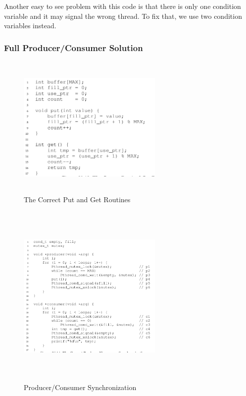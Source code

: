 Another easy to see problem with this code is that there is only one condition
variable and it may signal the wrong thread. To fix that, we use two condition
variables instead.

\subsubsection{Full Producer/Consumer Solution}

\begin{figure}[h!]
    \begin{center}
        \includegraphics[width=7cm, height=7cm]{img/3013.png}
        \caption{The Correct Put and Get Routines}
    \end{center}
\end{figure}

\begin{figure}[h!]
    \begin{center}
        \includegraphics[width=7cm, height=9cm]{img/3014.png}
        \caption{Producer/Consumer Synchronization}
    \end{center}
\end{figure}
